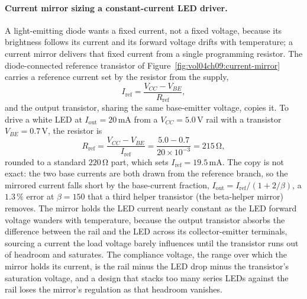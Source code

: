 \paragraph{Current mirror sizing a constant-current LED driver.}
A light-emitting diode wants a fixed current, not a fixed voltage, because its
brightness follows its current and its forward voltage drifts with temperature;
a current mirror delivers that fixed current from a single programming resistor.
The diode-connected reference transistor of Figure~\ref{fig:vol04ch09:current-mirror}
carries a reference current set by the resistor from the supply,
\[
I_{\text{ref}} = \frac{V_{CC} - V_{BE}}{R_{\text{ref}}},
\]
and the output transistor, sharing the same base-emitter voltage, copies it. To
drive a white LED at $I_{\text{out}} = 20\,\si{\milli\ampere}$ from a
$V_{CC} = 5.0\,\si{\volt}$ rail with a transistor $V_{BE} = 0.7\,\si{\volt}$,
the resistor is
\[
R_{\text{ref}} = \frac{V_{CC} - V_{BE}}{I_{\text{ref}}}
= \frac{5.0 - 0.7}{20\times 10^{-3}}
= 215\,\si{\ohm},
\]
rounded to a standard $220\,\si{\ohm}$ part, which sets $I_{\text{ref}} =
19.5\,\si{\milli\ampere}$. The copy is not exact: the two base currents are both
drawn from the reference branch, so the mirrored current falls short by the
base-current fraction, $I_{\text{out}} = I_{\text{ref}}/(1 + 2/\beta)$, a
$1.3\,\%$ error at $\beta = 150$ that a third helper transistor (the
beta-helper mirror) removes. The mirror holds the LED current nearly constant as
the LED forward voltage wanders with temperature, because the output transistor
absorbs the difference between the rail and the LED across its
collector-emitter terminals, sourcing a current the load voltage barely
influences until the transistor runs out of headroom and saturates. The compliance
voltage, the range over which the mirror holds its current, is the rail minus the
LED drop minus the transistor's saturation voltage, and a design that stacks too
many series LEDs against the rail loses the mirror's regulation as that headroom
vanishes.

